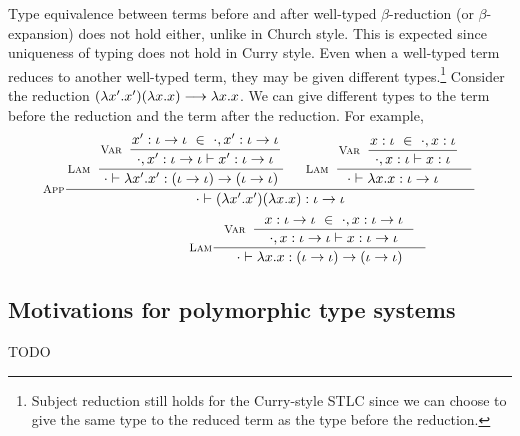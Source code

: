 Type equivalence between terms before and after well-typed $\beta$-reduction
(or $\beta$-expansion) does not hold either, unlike in Church style.
This is expected since uniqueness of typing does not hold in Curry style.
Even when a well-typed term reduces to another well-typed term, they may be
given different types.\footnote{Subject reduction still holds for
the Curry-style STLC since we can choose to give the same type to
the reduced term as the type before the reduction.}
Consider the reduction $(\lambda x'.x')(\lambda x.x) --> \lambda x.x$.
We can give different types to the term before the reduction and the
term after the reduction. For example,
\[\setpremisesend{.1em} 
\inference[\sc App]
 {
   \inference[\sc Lam]
     { \inference[\sc Var]
         {x' : \iota -> \iota ~\in~ \cdot, x' : \iota -> \iota}
         {\cdot,x' : \iota -> \iota |- x': \iota -> \iota}
     }
     {\cdot |- \l x'.x' : (\iota -> \iota) -> (\iota -> \iota)}
 &
   \inference[\sc Lam]
     {\inference[\sc Var]{x:\iota ~\in~ \cdot,x:\iota}
                         {\cdot,x:\iota |- x:\iota} \phantom{x'}}
     {\cdot |- \l x.x : \iota -> \iota \phantom{(x')}}
 }
 {\cdot |- (\l x'.x')(\l x.x) : \iota -> \iota}
\]
\[\qquad\qquad\qquad\quad
\inference[\sc Lam]
  {\inference[\sc Var]{x:\iota->\iota ~\in~ \cdot,x:\iota->\iota}
                      {\cdot,x:\iota->\iota |- x:\iota->\iota} }
  {\cdot |- \l x.x : (\iota -> \iota) -> (\iota -> \iota)}
\]


\paragraph{}

\subsection{Motivations for polymorphic type systems}\label{sec:stlc:topoly}
TODO

